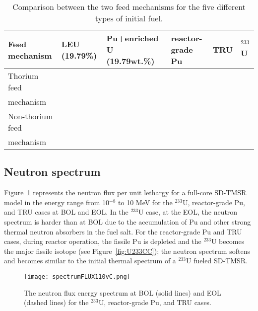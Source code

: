 \begin{table}  [!h]
	\begin{minipage}{\linewidth}
		\renewcommand\footnoterule{}
		\renewcommand{\thefootnote}{\alph{footnote}}
		\caption{Comparison between the two feed mechanisms for the five different 
			types of initial fuel.}
		\label{tab:comp_feeds}
		\vspace{0.1in}
		\begin{tabularx}{\textwidth}{p{} X p{} 
				p{} X X 
			}  %
			\hline
			Feed mechanism & \gls{LEU} (19.79\%) & Pu+enriched U (19.79wt.\%) &  
			reactor-grade Pu & \gls{TRU}& $^{233}$U \\
			\hline
			Thorium feed\\ mechanism&\xmark&\xmark&\xmark&\xmark& \cmark \\
			Non-thorium feed\\ mechanism &\xmark&\xmark&\cmark\footnotemark[1] 
			&\cmark\footnotemark[2] & \xmark\footnotemark[3] \\
			\hline
		\end{tabularx}
		\vspace{-1.5ex}%
	\end{minipage}
\end{table}
\FloatBarrier

\subsection{Neutron spectrum}
Figure~\ref{fig:spectrumFLUX110vC} represents the neutron flux per unit 
lethargy for a full-core SD-TMSR model in the energy range from 10$^{-8}$ to 10 
MeV for the $^{233}$U, reactor-grade Pu, and TRU cases at BOL and EOL. In the $^{233}$U 
case, at the EOL, the neutron spectrum is harder than at BOL due to the 
accumulation of Pu and other strong thermal neutron absorbers in the fuel 
salt. For the reactor-grade Pu and TRU cases, during reactor operation, the 
fissile Pu is depleted and the $^{233}$U becomes the major fissile isotope 
(see Figure~\ref{fig:U233CC}); the neutron spectrum softens and becomes 
similar to the initial thermal spectrum of a $^{233}$U fueled \gls{SD-TMSR}.
 \begin{figure}
 	\centering
 	\texttt{[image: spectrumFLUX110vC.png]}
 			\vspace{-0.4in}
 	\caption{The neutron flux energy spectrum at BOL (solid lines) and EOL (dashed lines) for the $^{233}$U, reactor-grade Pu, and TRU cases.}
 	\label{fig:spectrumFLUX110vC}
\end{figure}


